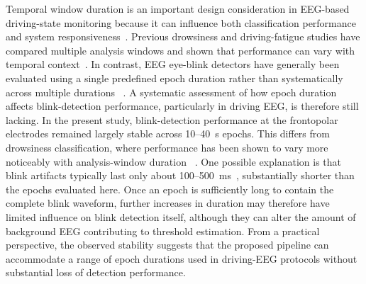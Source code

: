 \documentclass[journal,twoside,web]{ieeecolor}
\begin{document}
Temporal window duration is an important design consideration in EEG-based driving-state monitoring because it can influence both classification performance and system responsiveness~\citep{rashid2021random}. Previous drowsiness and driving-fatigue studies have compared multiple analysis windows and shown that performance can vary with temporal context~\citep{lee2023lstm,rashid2021random}.
In contrast, EEG eye-blink detectors have generally been evaluated using a single predefined epoch duration rather than systematically across multiple durations ~\citep{chang2016detection,wang2025sliding,shahbakhti2021vme}.
A systematic assessment of how epoch duration affects blink-detection performance, particularly in driving EEG, is therefore still lacking.
In the present study, blink-detection performance at the frontopolar electrodes remained largely stable across 10--40~s epochs.
This differs from drowsiness classification, where performance has been shown to vary more noticeably with analysis-window duration
~\citep{lee2023lstm}. One possible explanation is that blink artifacts typically last only about 100--500~ms~\citep{chang2016detection}, substantially shorter than the epochs evaluated here. Once an epoch is sufficiently long to contain the complete blink waveform, further increases in duration may therefore have limited influence on blink detection itself, although they can alter the amount of background EEG contributing to threshold estimation. From a practical perspective, the observed stability suggests that the proposed pipeline can accommodate a range of epoch durations used in driving-EEG protocols without substantial loss of detection performance.
 
%
%
%
%
%
%
%
\end{document}
